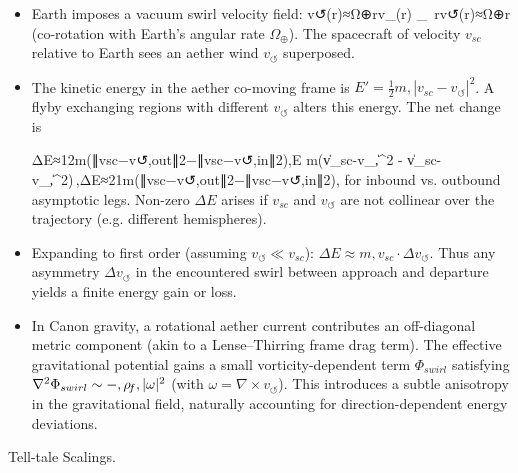 \documentclass[11pt]{article}
\begin{document}
\begin{itemize}

\item 
Earth imposes a vacuum swirl velocity field: v↺(r)≈Ω⊕rv_{\circlearrowleft}(r) \approx \Omega_{\oplus}\, rv↺(r)≈Ω⊕r (co-rotation with Earth’s angular rate $\Omega_{\oplus}$). The spacecraft of velocity $v_{sc}$ relative to Earth sees an aether wind $v_{\circlearrowleft}$ superposed.




\item 
The kinetic energy in the aether co-moving frame is $E' = \frac{1}{2} m,|v_{sc} - v_{\circlearrowleft}|^2$. A flyby exchanging regions with different $v_{\circlearrowleft}$ alters this energy. The net change is


ΔE≈12m(∥vsc−v↺,out∥2−∥vsc−v↺,in∥2),\Delta E \;\approx\;  m\Big(\|v_{sc}-v_{\circlearrowleft,}\|^2 - \|v_{sc}-v_{\circlearrowleft,}\|^2\Big)\,,ΔE≈21m(∥vsc−v↺,out∥2−∥vsc−v↺,in∥2),
for inbound vs. outbound asymptotic legs. Non-zero $\Delta E$ arises if $v_{sc}$ and $v_{\circlearrowleft}$ are not collinear over the trajectory (e.g. different hemispheres).




\item 
Expanding to first order (assuming $v_{\circlearrowleft} \ll v_{sc}$): $\Delta E \approx m,v_{sc}\cdot\Delta v_{\circlearrowleft}$. Thus any asymmetry $\Delta v_{\circlearrowleft}$ in the encountered swirl between approach and departure yields a finite energy gain or loss.




\item 
In Canon gravity, a rotational aether current contributes an off-diagonal metric component (akin to a Lense–Thirring frame drag term). The effective gravitational potential gains a small vorticity-dependent term $\Phi_{swirl}$ satisfying $\nabla^2 \Phi_{swirl} \sim -,\rho_{\!f},|\omega|^2$ (with $\omega = \nabla\times v_{\circlearrowleft}$). This introduces a subtle anisotropy in the gravitational field, naturally accounting for direction-dependent energy deviations.




\end{itemize}

Tell-tale Scalings.
\end{document}

